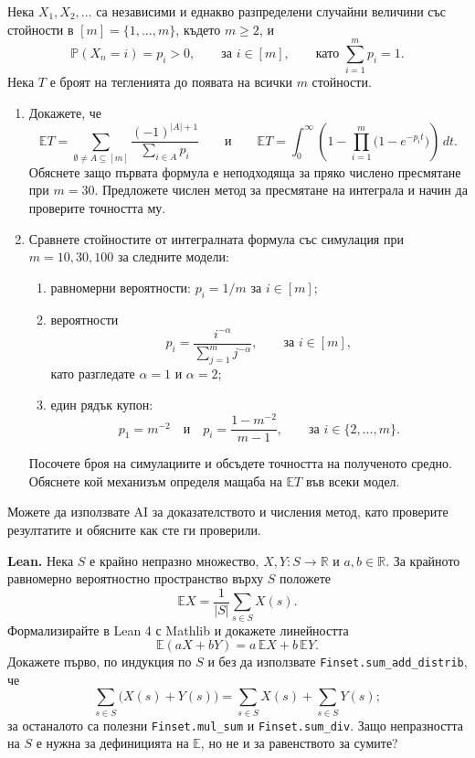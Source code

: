 \documentclass[11pt,a4paper]{article}
\newenvironment{enumeratea}{\begin{enumerate}[label=(\alph*),itemsep=0.28em,topsep=0.25em]}{\end{enumerate}}
\newcommand{\Pbb}{\mathbb P}
\newcommand{\Ebb}{\mathbb E}
\begin{document}
\begin{researchtask}
Нека $X_1,X_2,\dots$ са независими и еднакво разпределени случайни
величини със стойности в $[m]=\{1,\dots,m\}$, където $m\ge2$, и
\[
\Pbb(X_n=i)=p_i>0,
\qquad\text{за }i\in[m],
\qquad\text{като }\sum_{i=1}^m p_i=1.
\]
Нека $T$ е броят на тегленията до появата на всички $m$ стойности.
\begin{enumeratea}
  \item Докажете, че
  \[
  \Ebb T=
  \sum_{\emptyset\ne A\subseteq[m]}
  \frac{(-1)^{|A|+1}}{\sum_{i\in A}p_i}
  \qquad\text{и}
\qquad
  \Ebb T=
  \int_0^\infty
  \left(1-\prod_{i=1}^m\bigl(1-e^{-p_it}\bigr)\right)\,dt.
  \]
  Обяснете защо първата формула е неподходяща за пряко числено пресмятане
  при $m=30$. Предложете числен метод за пресмятане на интеграла и
  начин да проверите точността му.
  \item Сравнете стойностите от интегралната формула със симулация при
  $m=10,30,100$ за следните модели:
  \begin{enumerate}[label=(\roman*)]
    \item равномерни вероятности:
    $p_i=1/m$ за $i\in[m]$;
    \item вероятности
    \[
    p_i=\frac{i^{-\alpha}}{\sum_{j=1}^m j^{-\alpha}},
    \qquad\text{за }i\in[m],
    \]
    като разгледате $\alpha=1$ и $\alpha=2$;
    \item един рядък купон:
    \[
    p_1=m^{-2}
    \quad\text{и}\quad
    p_i=\frac{1-m^{-2}}{m-1},
    \qquad\text{за }i\in\{2,\dots,m\}.
    \]
  \end{enumerate}
  Посочете броя на симулациите и обсъдете точността на полученото средно.
  Обяснете кой механизъм определя мащаба на $\Ebb T$ във всеки модел.
\end{enumeratea}
Можете да използвате AI за доказателството и числения метод, като
проверите резултатите и обясните как сте ги проверили.
\end{researchtask}

\noindent\textbf{Lean.} Нека $S$ е крайно непразно множество, $X,Y:S\to\mathbb R$
и $a,b\in\mathbb R$. За крайното равномерно вероятностно пространство върху $S$
положете
\[
\Ebb X=\frac1{|S|}\sum_{s\in S}X(s).
\]
Формализирайте в Lean 4 с Mathlib и докажете линейността
\[
\Ebb(aX+bY)=a\,\Ebb X+b\,\Ebb Y.
\]
Докажете първо, по индукция по $S$ и без да използвате
\texttt{Finset.sum\_add\_distrib}, че
\[
\sum_{s\in S}\bigl(X(s)+Y(s)\bigr)
=
\sum_{s\in S}X(s)+\sum_{s\in S}Y(s);
\]
за останалото са полезни \texttt{Finset.mul\_sum} и \texttt{Finset.sum\_div}.
Защо непразността на $S$ е нужна за дефиницията на $\Ebb$, но не и за
равенството за сумите?
\end{document}
